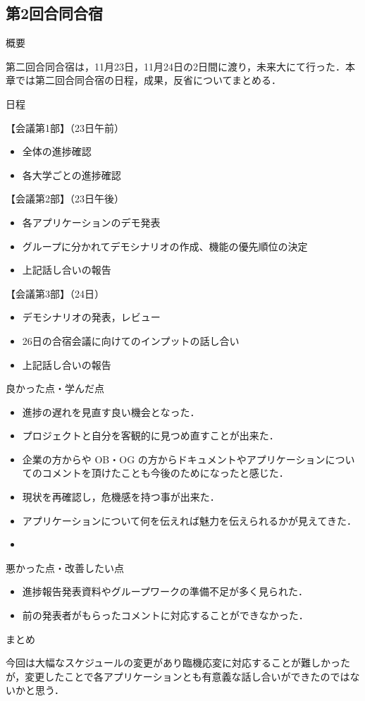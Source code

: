 \subsection{第2回合同合宿}
\par
概要
\par 
第二回合同合宿は，11月23日，11月24日の2日間に渡り，未来大にて行った．本章では第二回合同合宿の日程，成果，反省についてまとめる．
\par
日程
\par
【会議第1部】（23日午前）
\begin{itemize}
\item 全体の進捗確認
\item 各大学ごとの進捗確認
\end{itemize}
【会議第2部】（23日午後）
\begin{itemize}
\item 各アプリケーションのデモ発表
\item グループに分かれてデモシナリオの作成、機能の優先順位の決定
\item 上記話し合いの報告
\end{itemize}
【会議第3部】（24日）
\begin{itemize}
\item デモシナリオの発表，レビュー
\item 26日の合宿会議に向けてのインプットの話し合い
\item 上記話し合いの報告
\end{itemize}

\par
良かった点・学んだ点
\begin{itemize}
\item 進捗の遅れを見直す良い機会となった．
\item プロジェクトと自分を客観的に見つめ直すことが出来た．
\item 企業の方からや OB・OG の方からドキュメントやアプリケーションについてのコメントを頂けたことも今後のためになったと感じた．
\item 現状を再確認し，危機感を持つ事が出来た．
\item アプリケーションについて何を伝えれば魅力を伝えられるかが見えてきた．
\item 
\end{itemize}
\par
悪かった点・改善したい点
\begin{itemize}
\item 進捗報告発表資料やグループワークの準備不足が多く見られた．
\item 前の発表者がもらったコメントに対応することができなかった．
\end{itemize}
\par
まとめ
\par 今回は大幅なスケジュールの変更があり臨機応変に対応することが難しかったが，変更したことで各アプリケーションとも有意義な話し合いができたのではないかと思う．

